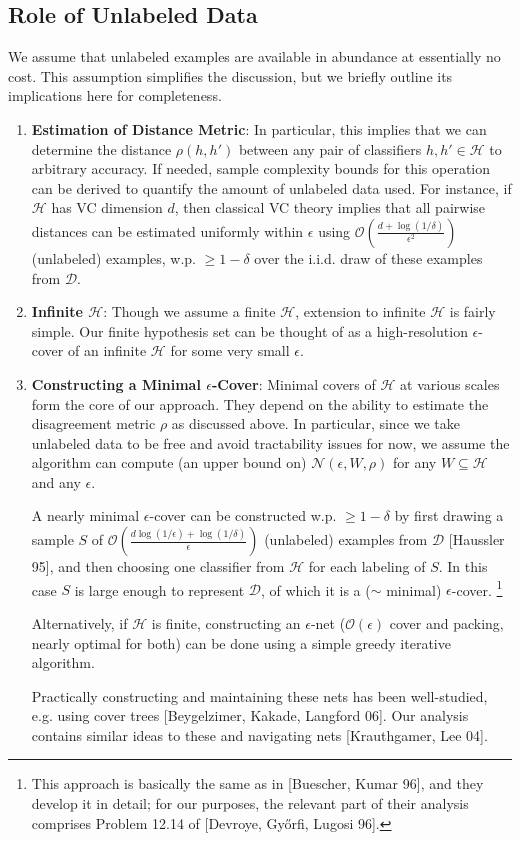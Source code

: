 \documentclass{article}[12pt]
\theoremstyle{named}
\newcommand{\cH}{\mathcal{H}}
\newcommand{\cD}{\mathcal{D}}
\newcommand{\cN}{\mathcal{N}}
\newcommand{\cO}[1]{\mathcal{O}\left(#1\right)}
\begin{document}
\subsection{Role of Unlabeled Data}
\label{sec:unlabeleddata}

We assume that unlabeled examples are available in abundance at essentially no cost. 
This assumption simplifies the discussion, but we briefly outline its implications here for completeness.

\begin{enumerate}
\item
\textbf{Estimation of Distance Metric}:  
In particular, this implies that we can determine the distance $\rho(h, h')$ 
between any pair of classifiers $h, h' \in \cH$ to arbitrary accuracy. 
If needed, sample complexity bounds for this operation can be derived to quantify the amount of unlabeled data used. 
For instance, if $\cH$ has VC dimension $d$, then classical VC theory implies that all pairwise distances 
can be estimated uniformly within $\epsilon$ using $\cO{ \frac{d + \log (1/\delta)}{\epsilon^{2}} }$ (unlabeled) examples, 
w.p. $\geq 1-\delta$ over the i.i.d. draw of these examples from $\cD$. 

\item
\textbf{Infinite $\cH$}: 
Though we assume a finite $\cH$, 
extension to infinite $\cH$ is fairly simple.
Our finite hypothesis set can be thought of as a high-resolution $\epsilon$-cover of 
an infinite $\cH$ for some very small $\epsilon$. 

\item
\textbf{Constructing a Minimal $\epsilon$-Cover}: 
Minimal covers of $\cH$ at various scales form the core of our approach. 
They depend on the ability to estimate the disagreement metric $\rho$ as discussed above. 
In particular, since we take unlabeled data to be free and avoid tractability issues for now, 
we assume the algorithm can compute (an upper bound on) $\cN (\epsilon, W, \rho)$ 
for any $W \subseteq \cH$ and any $\epsilon$.

A nearly minimal $\epsilon$-cover can be constructed w.p. $\geq 1-\delta$ 
by first drawing a sample $S$ of 
$\cO{ \frac{d \log (1/\epsilon) + \log (1/\delta)}{\epsilon} }$ (unlabeled) examples from $\cD$ [Haussler 95], 
and then choosing one classifier from $\cH$ for each labeling of $S$.
In this case $S$ is large enough to represent $\cD$, of which it is a ($\sim$ minimal) $\epsilon$-cover. 
\footnote{This approach is basically the same as in [Buescher, Kumar 96], 
and they develop it in detail; 
for our purposes, the relevant part of their analysis comprises Problem 12.14 of [Devroye, Gy\H{o}rfi, Lugosi 96].}

Alternatively, if $\cH$ is finite, 
constructing an $\epsilon$-net ($\cO{\epsilon}$ cover and packing, nearly optimal for both) 
can be done using a simple greedy iterative algorithm. 

Practically constructing and maintaining these nets has been well-studied, e.g. using cover trees [Beygelzimer, Kakade, Langford 06]. 
Our analysis contains similar ideas to these and navigating nets [Krauthgamer, Lee 04].
\end{enumerate}
\end{document}
